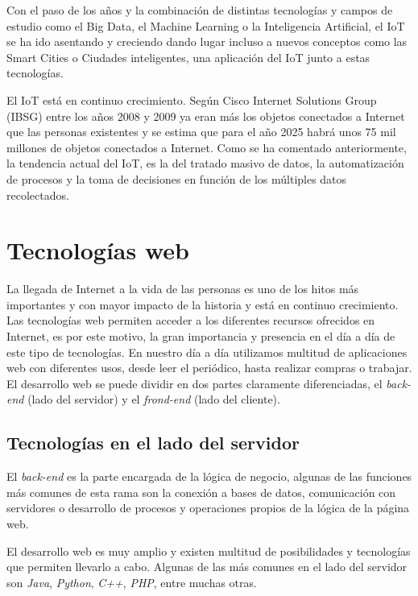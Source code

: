 \documentclass[a4paper, 12pt, oneside]{book}
\begin{document}
Con el paso de los años y la combinación de distintas tecnologías y campos de estudio como el Big Data, el Machine Learning o la Inteligencia Artificial, el IoT se ha ido asentando y creciendo dando lugar incluso a nuevos conceptos como las Smart Cities o Ciudades inteligentes, una aplicación del IoT junto a estas tecnologías.

El IoT está en continuo crecimiento. Según Cisco Internet Solutions Group (IBSG) entre los años 2008 y 2009 ya eran más los objetos conectados a Internet que las personas existentes y se estima que para el año 2025 habrá unos 75 mil millones de objetos conectados a Internet. Como se ha comentado anteriormente, la tendencia actual del IoT, es la del tratado masivo de datos, la automatización de procesos y la toma de decisiones en función de los múltiples datos recolectados.

\section{Tecnologías web}
\label{sec:tecnologías web}
La llegada de Internet a la vida de las personas es uno de los hitos más importantes y con mayor impacto de la historia y está en continuo crecimiento. Las tecnologías web permiten acceder a los diferentes recursos ofrecidos en Internet, es por este motivo, la gran importancia y presencia en el día a día de este tipo de tecnologías. En nuestro día a día utilizamos multitud de aplicaciones web con diferentes usos, desde leer el periódico, hasta realizar compras o trabajar.
El desarrollo web se puede dividir en dos partes claramente diferenciadas, el \textit{back-end} (lado del servidor) y el \textit{frond-end} (lado del cliente).

\subsection{Tecnologías en el lado del servidor}
\label{subsec:tecnologías en el lado del servidor}
 El \textit{back-end} es la parte encargada de la lógica de negocio, algunas de las funciones más comunes de esta rama son la conexión a bases de datos, comunicación con servidores o desarrollo de procesos y operaciones propios de la lógica de la página web.
 
El desarrollo web es muy amplio y existen multitud de posibilidades y tecnologías que permiten llevarlo a cabo. Algunas de las más comunes en el lado del servidor son \textit{Java}, \textit{Python}, \textit{C++}, \textit{PHP}, entre muchas otras.
\end{document}
